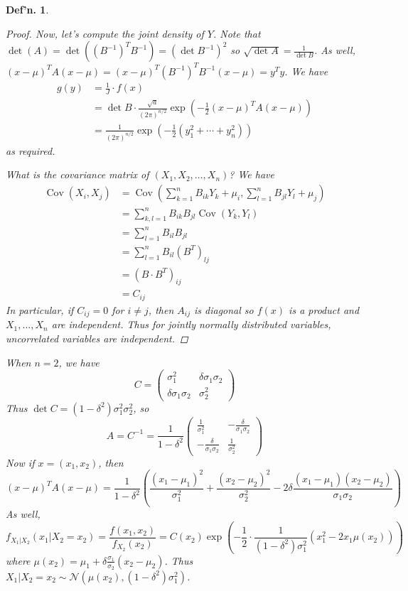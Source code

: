 \documentclass[12pt, a4paper]{book}
\DeclareMathOperator{\Cov}{Cov}
\newtheorem{definition}[theorem]{Def'n.}
\theoremstyle{nonumberplain}
\newtheorem{proof}{Proof}
\begin{document}
\begin{definition}
\begin{proof}
    Now, let's compute the joint density of $Y$.
    Note that $\det(A)=\det((B^{-1})^TB^{-1})=(\det B^{-1})^2$ so $\sqrt{\det A}=\frac{1}{\det B}$.
    As well, $(x-\mu)^TA(x-\mu)=(x-\mu)^T(B^{-1})^TB^{-1}(x-\mu)=y^Ty$.
    We have
    \begin{align*}
        g(y) &= \frac{1}{J}\cdot f(x)\\
             &= \det B\cdot\frac{\sqrt{a}}{(2\pi)^{n/2}}\exp\left(-\frac{1}{2}(x-\mu)^TA(x-\mu)\right)\\
             &= \frac{1}{(2\pi)^{n/2}}\exp\left(-\frac{1}{2}(y_1^2+\cdots+y_n^2)\right)
    \end{align*}
    as required.

    What is the covariance matrix of $(X_1,X_2,\ldots,X_n)$?
    We have
    \begin{align*}
        \Cov(X_i,X_j) &= \Cov\left(\sum\limits_{k=1}^n B_{ik}Y_k+\mu_i,\sum\limits_{l=1}^n B_{jl}Y_l+\mu_j\right)\\
                      &= \sum\limits_{k,l=1}^n B_{ik}B_{jl}\Cov(Y_k,Y_l)\\
                      &= \sum\limits_{l=1}^n B_{il}B_{jl}\\
                      &= \sum\limits_{l=1}^n B_{il}(B^T)_{lj}\\
                      &= (B\cdot B^T)_{ij}\\
                      &= C_{ij}
    \end{align*}
    In particular, if $C_{ij}=0$ for $i\neq j$, then $A_{ij}$ is diagonal so $f(x)$ is a product and $X_1,\ldots,X_n$ are independent.
    Thus for jointly normally distributed variables, uncorrelated variables are independent.
\end{proof}
When $n=2$, we have
\[C=\begin{pmatrix}\sigma_1^2&\delta\sigma_1\sigma_2\\\delta\sigma_1\sigma_2&\sigma_2^2\end{pmatrix}\]
Thus $\det C=(1-\delta^2)\sigma_1^2\sigma_2^2$, so
\[A=C^{-1}=\frac{1}{1-\delta^2}\begin{pmatrix}\frac{1}{\sigma_1^2} &-\frac{\delta}{\sigma_1\sigma_2}\\-\frac{\delta}{\sigma_1\sigma_2} &\frac{1}{\sigma_2^2}\end{pmatrix}\]
Now if $x=(x_1,x_2)$, then
\[(x-\mu)^TA(x-\mu)=\frac{1}{1-\delta^2}\left(\frac{(x_1-\mu_1)^2}{\sigma_1^2}+\frac{(x_2-\mu_2)^2}{\sigma_2^2}-2\delta\frac{(x_1-\mu_1)(x_2-\mu_2)}{\sigma_1\sigma_2}\right)\]
As well,
\[f_{X_1|X_2}(x_1|X_2=x_2) = \frac{f(x_1,x_2)}{f_{X_2}(x_2)}=C(x_2)\exp\left(-\frac{1}{2}\cdot\frac{1}{(1-\delta^2)\sigma_1^2}(x_1^2-2x_1\mu(x_2))\right)\]
where $\mu(x_2)=\mu_1+\delta\frac{\sigma_1}{\sigma_2}(x_2-\mu_2)$.
Thus $X_1|X_2=x_2\sim\mathcal{N}(\mu(x_2),(1-\delta^2)\sigma_1^2)$.

\end{definition}
\end{document}
